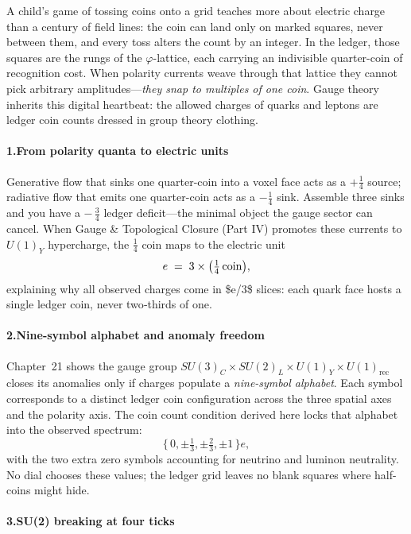 \documentclass[11pt,oneside]{book}
\begin{document}
A child’s game of tossing coins onto a grid teaches more about electric
charge than a century of field lines: the coin can land only on marked
squares, never between them, and every toss alters the count by an
integer.  In the ledger, those squares are the rungs of the
$\varphi$-lattice, each carrying an indivisible quarter-coin of
recognition cost.  When polarity currents weave through that lattice
they cannot pick arbitrary amplitudes—\emph{they snap to multiples of
one coin}.  Gauge theory inherits this digital heartbeat: the allowed
charges of quarks and leptons are ledger coin counts dressed in group
theory clothing.

\paragraph*{1.\;From polarity quanta to electric units}

Generative flow that sinks one quarter-coin into a voxel face acts as a
$+\tfrac14$ source; radiative flow that emits one quarter-coin acts as a
$-\tfrac14$ sink.  Assemble three sinks and you have a $-\,\tfrac34$
ledger deficit—the minimal object the gauge sector can cancel.  When
Gauge \& Topological Closure (Part IV) promotes these currents to
$U(1)_Y$ hypercharge, the $\tfrac14$ coin maps to the electric unit
\[
  e \;=\; 3\times\bigl(\tfrac14\text{\,coin}\bigr),
\]
explaining why all observed charges come in \$\pm e/3\$ slices: each
quark face hosts a single ledger coin, never two‐thirds of one.

\paragraph*{2.\;Nine-symbol alphabet and anomaly freedom}

Chapter~21 shows the gauge group
$SU(3)_C\times SU(2)_L\times U(1)_Y\times U(1)_{\text{rec}}$ closes its
anomalies only if charges populate a \emph{nine-symbol alphabet}.  Each
symbol corresponds to a distinct ledger coin configuration across the
three spatial axes and the polarity axis.  The coin count condition
derived here locks that alphabet into the observed spectrum:
\[
  \bigl\{\,0,\pm\tfrac13,\pm\tfrac23,\pm1\,\bigr\}e,
\]
with the two extra zero symbols accounting for neutrino and luminon
neutrality.  No dial chooses these values; the ledger grid leaves no
blank squares where half-coins might hide.

\paragraph*{3.\;SU(2) breaking at four ticks}
\end{document}
